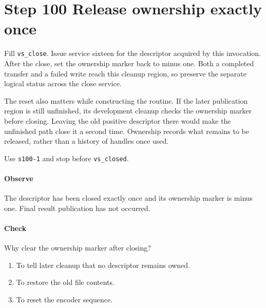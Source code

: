 \section{Step 100 Release ownership exactly once}
Fill \texttt{vs\_close}. Issue service sixteen for the descriptor acquired by this invocation. After the close, set the ownership marker back to minus one. Both a completed transfer and a failed write reach this cleanup region, so preserve the separate logical status across the close service.

The reset also matters while constructing the routine. If the later publication region is still unfinished, its development cleanup checks the ownership marker before closing. Leaving the old positive descriptor there would make the unfinished path close it a second time. Ownership records what remains to be released, rather than a history of handles once used.

Use \texttt{s100-1} and stop before \texttt{vs\_closed}.

\paragraph{Observe} The descriptor has been closed exactly once and its ownership marker is minus one. Final result publication has not occurred.

\paragraph{Check} Why clear the ownership marker after closing?
\begin{enumerate}[label=\Alph*.]
  \item To tell later cleanup that no descriptor remains owned.
  \item To restore the old file contents.
  \item To reset the encoder sequence.
\end{enumerate}
